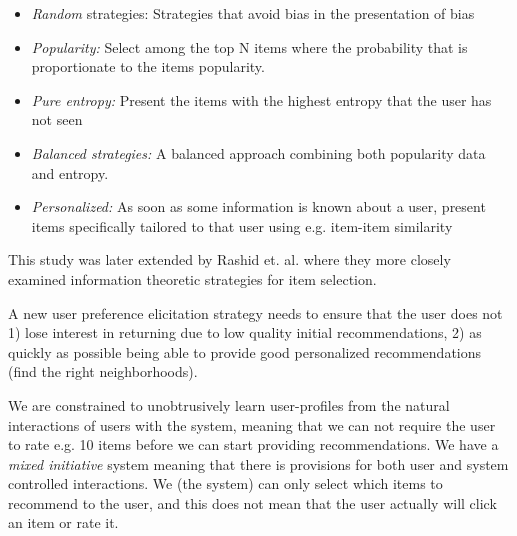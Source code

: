 \begin{itemize}
\item \emph{Random} strategies: Strategies that avoid bias in the presentation
of bias

\item \emph{Popularity:} Select among the top N items where the probability
that is proportionate to the items popularity.

\item \emph{Pure entropy:} Present the items with the highest entropy that the
user has not seen

\item \emph{Balanced strategies:} A balanced approach combining both popularity
data and entropy.

\item \emph{Personalized:} As soon as some information is known about a user,
present items specifically tailored to that user using e.g. item-item
similarity
\end{itemize}

This study was later extended by Rashid et. al. \cite{Rashid2008} where they
more closely examined information theoretic strategies for item selection.


A new user preference elicitation strategy needs to ensure that the user does
not 1) lose interest in returning due to low quality initial recommendations,
2) as quickly as possible being able to provide good personalized
recommendations (find the right neighborhoods).

We are constrained to unobtrusively learn user-profiles from the natural
interactions of users with the system, meaning that we can not require the user
to rate e.g. 10 items before we can start providing recommendations. We have a
\emph{mixed initiative} system meaning that there is provisions for both user
and system controlled interactions. We (the system) can only select which items
to recommend to the user, and this does not mean that the user actually will
click an item or rate it.


